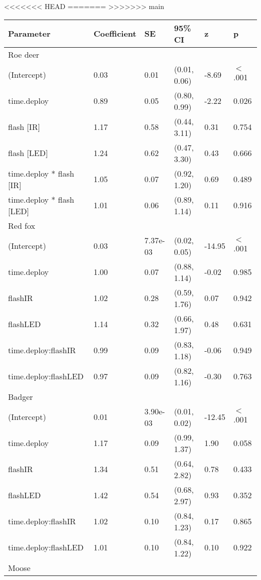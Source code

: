 <<<<<<< HEAD
=======
>>>>>>> main
\begin{table}[ht]
\centering
\begin{tabular}{llllll}
  \hline
Parameter & Coefficient & SE & 95\% CI & z & p \\ 
  \hline
Roe deer &  &  &  &  &        \\ 
  (Intercept) & 0.03 & 0.01 & (0.01, 0.06) & -8.69 & $<$ .001 \\ 
  time.deploy & 0.89 & 0.05 & (0.80, 0.99) & -2.22 & 0.026  \\ 
  flash [IR] & 1.17 & 0.58 & (0.44, 3.11) & 0.31 & 0.754  \\ 
  flash [LED] & 1.24 & 0.62 & (0.47, 3.30) & 0.43 & 0.666  \\ 
  time.deploy * flash [IR] & 1.05 & 0.07 & (0.92, 1.20) & 0.69 & 0.489  \\ 
  time.deploy * flash [LED] & 1.01 & 0.06 & (0.89, 1.14) & 0.11 & 0.916  \\ 
  Red fox &  &  &  &  &        \\ 
  (Intercept) & 0.03 & 7.37e-03 & (0.02, 0.05) & -14.95 & $<$ .001 \\ 
  time.deploy & 1.00 & 0.07 & (0.88, 1.14) & -0.02 & 0.985  \\ 
  flashIR & 1.02 & 0.28 & (0.59, 1.76) & 0.07 & 0.942  \\ 
  flashLED & 1.14 & 0.32 & (0.66, 1.97) & 0.48 & 0.631  \\ 
  time.deploy:flashIR & 0.99 & 0.09 & (0.83, 1.18) & -0.06 & 0.949  \\ 
  time.deploy:flashLED & 0.97 & 0.09 & (0.82, 1.16) & -0.30 & 0.763  \\ 
  Badger &  &  &  &  &        \\ 
  (Intercept) & 0.01 & 3.90e-03 & (0.01, 0.02) & -12.45 & $<$ .001 \\ 
  time.deploy & 1.17 & 0.09 & (0.99, 1.37) & 1.90 & 0.058  \\ 
  flashIR & 1.34 & 0.51 & (0.64, 2.82) & 0.78 & 0.433  \\ 
  flashLED & 1.42 & 0.54 & (0.68, 2.97) & 0.93 & 0.352  \\ 
  time.deploy:flashIR & 1.02 & 0.10 & (0.84, 1.23) & 0.17 & 0.865  \\ 
  time.deploy:flashLED & 1.01 & 0.10 & (0.84, 1.22) & 0.10 & 0.922  \\ 
  Moose &  &  &  &  &        \\ 

\end{tabular}
\end{table}
